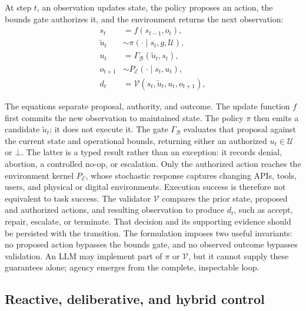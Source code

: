 \begin{samepage}
At step $t$, an observation updates state, the policy proposes an action, the bounds gate authorizes it, and the environment returns the next observation:
\begin{align}
s_t &= f(s_{t-1},o_t),\\
\tilde{u}_t &\sim \pi(\cdot\mid s_t,g,\mathcal{U}),\\
u_t &= \Gamma_{\mathcal{B}}(\tilde{u}_t,s_t),\\
o_{t+1} &\sim P_{\mathcal{E}}(\cdot\mid s_t,u_t),\\
d_t &= \mathcal{V}(s_t,\tilde{u}_t,u_t,o_{t+1}),
\end{align}
\end{samepage}
The equations separate proposal, authority, and outcome. The update function $f$ first commits the new observation to maintained state. The policy $\pi$ then emits a candidate $\tilde{u}_t$; it does not execute it. The gate $\Gamma_{\mathcal{B}}$ evaluates that proposal against the current state and operational bounds, returning either an authorized $u_t\in\mathcal{U}$ or $\bot$. The latter is a typed result rather than an exception: it records denial, abortion, a controlled no-op, or escalation. Only the authorized action reaches the environment kernel $P_{\mathcal{E}}$, whose stochastic response captures changing APIs, tools, users, and physical or digital environments. Execution success is therefore not equivalent to task success. The validator $\mathcal{V}$ compares the prior state, proposed and authorized actions, and resulting observation to produce $d_t$, such as accept, repair, escalate, or terminate. That decision and its supporting evidence should be persisted with the transition. The formulation imposes two useful invariants: no proposed action bypasses the bounds gate, and no observed outcome bypasses validation. An LLM may implement part of $\pi$ or $\mathcal{V}$, but it cannot supply these guarantees alone; agency emerges from the complete, inspectable loop.

\subsection{Reactive, deliberative, and hybrid control}

